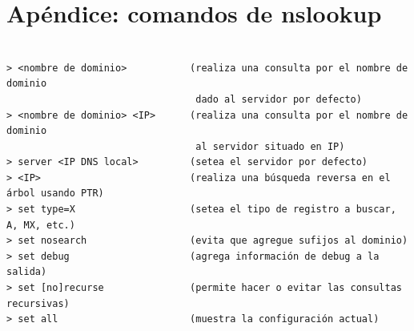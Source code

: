 \documentclass[a4paper,10pt]{article}
\begin{document}
\newpage

\section*{Apéndice: comandos de nslookup}


\begin{verbatim}

> <nombre de dominio>           (realiza una consulta por el nombre de dominio
                                 dado al servidor por defecto)
> <nombre de dominio> <IP>      (realiza una consulta por el nombre de dominio 
                                 al servidor situado en IP)
> server <IP DNS local>         (setea el servidor por defecto)
> <IP>                          (realiza una búsqueda reversa en el árbol usando PTR)
> set type=X                    (setea el tipo de registro a buscar, A, MX, etc.)
> set nosearch                  (evita que agregue sufijos al dominio)
> set debug                     (agrega información de debug a la salida)
> set [no]recurse               (permite hacer o evitar las consultas recursivas)
> set all                       (muestra la configuración actual)
\end{verbatim}
\end{document}
